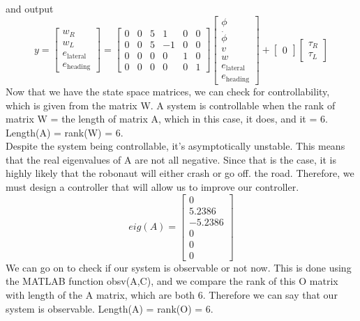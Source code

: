 \documentclass{article}
\begin{document}
and output
\begin{equation*}
y =
\begin{bmatrix}
w_{R}\\
w_{L}\\
e_\text{lateral}\\
e_\text{heading}
\end{bmatrix}
=
\begin{bmatrix}
0& 0& 5&1& 0&  0\\
0&0& 5& -1&0& 0\\
0& 0& 0& 0& 1&  0\\
0& 0& 0& 0& 0&  1
\end{bmatrix}
\begin{bmatrix}
\phi \\
\dot{\phi}\\
v\\
w\\
e_\text{lateral} \\
e_\text{heading}
\end{bmatrix}
+
\begin{bmatrix} 
0
\end{bmatrix}
\begin{bmatrix}
    \tau_{R}\\
\tau_{L}
    \end{bmatrix}
\end{equation*}
Now that we have the state space matrices, we can check for controllability, which is given from the matrix W. A system is controllable when the rank of matrix W = the length of matrix A, which in this case, it does, and it = 6. Length(A) = rank(W) = 6.\\
Despite the system being controllable, it's asymptotically unstable. This means that the real eigenvalues of A are not all negative. Since that is the case, it is highly likely that the robonaut will either crash or go off. the road. Therefore, we must design a controller that will allow us to improve our controller.
\begin{equation*}
    eig(A) = \begin{bmatrix}
    0\\5.2386\\-5.2386\\0\\0\\0
    \end{bmatrix}
\end{equation*}
We can go on to check if our system is observable or not now. This is done using the MATLAB function obsv(A,C), and we compare the rank of this O matrix with length of the A matrix, which are both 6. Therefore we can say that our system is observable. Length(A) = rank(O) = 6.
\end{document}
